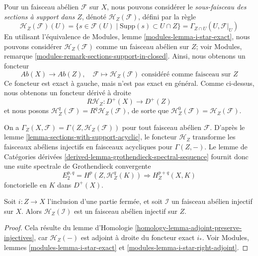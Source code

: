 \medskip\noindent

Pour un faisceau abélien $\mathcal{F}$ sur $X$, nous pouvons considérer le
{\it sous-faisceau des sections à support dans $Z$}, dénoté
$\mathcal{H}_Z(\mathcal{F})$, défini par la règle
$$
\mathcal{H}_Z(\mathcal{F})(U) =
\{s \in \mathcal{F}(U) \mid \text{Supp}(s) \subset U \cap Z\} =
\Gamma_{Z \cap U}(U, \mathcal{F}|_U)
$$
En utilisant l'équivalence de Modules, lemme \ref{modules-lemma-i-star-exact},
nous pouvons considérer $\mathcal{H}_Z(\mathcal{F})$ comme un faisceau abélien sur $Z$; voir Modules, remarque \ref{modules-remark-sections-support-in-closed}. Ainsi, nous obtenons un foncteur
$$
\textit{Ab}(X) \longrightarrow \textit{Ab}(Z),\quad
\mathcal{F} \longmapsto
\mathcal{H}_Z(\mathcal{F})\text{ considéré comme faisceau sur }Z
$$
Ce foncteur est exact à gauche, mais n'est pas exact en général. Comme ci-dessus, nous obtenons un foncteur dérivé à droite
$$
R\mathcal{H}_Z : D^+(X) \longrightarrow D^+(Z)
$$
et nous posons
$\mathcal{H}^q_Z(\mathcal{F}) = R^q\mathcal{H}_Z(\mathcal{F})$, de sorte que
$\mathcal{H}^0_Z(\mathcal{F}) = \mathcal{H}_Z(\mathcal{F})$.

\medskip\noindent
On a $\Gamma_Z(X, \mathcal{F}) = \Gamma(Z, \mathcal{H}_Z(\mathcal{F}))$ pour tout faisceau abélien $\mathcal{F}$. D'après le lemme \ref{lemma-sections-with-support-acyclic}, le foncteur $\mathcal{H}_Z$ transforme les faisceaux abéliens injectifs en faisceaux acycliques pour $\Gamma(Z, -)$. Le lemme de Catégories dérivées \ref{derived-lemma-grothendieck-spectral-sequence} fournit donc une suite spectrale de Grothendieck convergente $$
E_2^{p, q} = H^p(Z, \mathcal{H}^q_Z(K)) \Rightarrow H^{p + q}_Z(X, K)
$$ fonctorielle en $K$ dans $D^+(X)$.

\begin{lemma}

\label{lemma-sections-with-support-acyclic}
Soit $i : Z \to X$ l'inclusion d'une partie fermée, et soit $\mathcal{I}$ un faisceau abélien injectif sur $X$. Alors $\mathcal{H}_Z(\mathcal{I})$ est un faisceau abélien injectif sur $Z$.
\end{lemma}

\begin{proof}
Cela résulte du lemme d'Homologie \ref{homology-lemma-adjoint-preserve-injectives}, car $\mathcal{H}_Z(-)$ est adjoint à droite du foncteur exact $i_*$. Voir Modules, lemmes \ref{modules-lemma-i-star-exact} et \ref{modules-lemma-i-star-right-adjoint}.
\end{proof}



